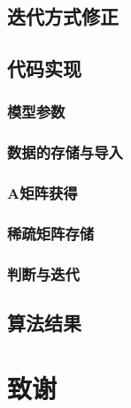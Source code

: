 \section{迭代方式修正}

\section{代码实现}
\subsection{模型参数}
\subsection{数据的存储与导入}
\subsection{A矩阵获得}
\subsection{稀疏矩阵存储}
\subsection{判断与迭代}
\section{算法结果}

\chapter{致谢}




